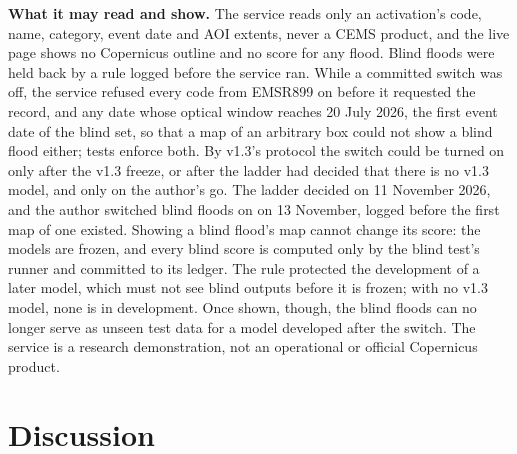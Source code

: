 \documentclass[10pt,twocolumn,a4paper]{article}
\begin{document}
\textbf{What it may read and show.} The service reads only an activation's code, name, category, event date and AOI
extents, never a CEMS product, and the live page shows no Copernicus outline and no score for any flood. Blind floods
were held back by a rule logged before the service ran. While a committed switch was off, the service refused every
code from EMSR899 on before it requested the record, and any date whose optical window reaches 20 July 2026, the first
event date of the blind set, so that a map of an arbitrary box could not show a blind flood either; tests enforce
both. By v1.3's protocol the switch could be turned on only after the v1.3 freeze, or after the ladder had decided
that there is no v1.3 model, and only on the author's go. The ladder decided on 11 November 2026, and the author
switched blind floods on on 13 November, logged before the first map of one existed. Showing a blind flood's map
cannot change its score: the models are frozen, and every blind score is computed only by the blind test's runner and
committed to its ledger. The rule protected the development of a later model, which must not see blind outputs before
it is frozen; with no v1.3 model, none is in development. Once shown, though, the blind floods can no longer serve
as unseen test data for a model developed after the switch. The service is a research demonstration, not an
operational or official Copernicus product.

\section{Discussion}\label{sec:discussion}
\end{document}
